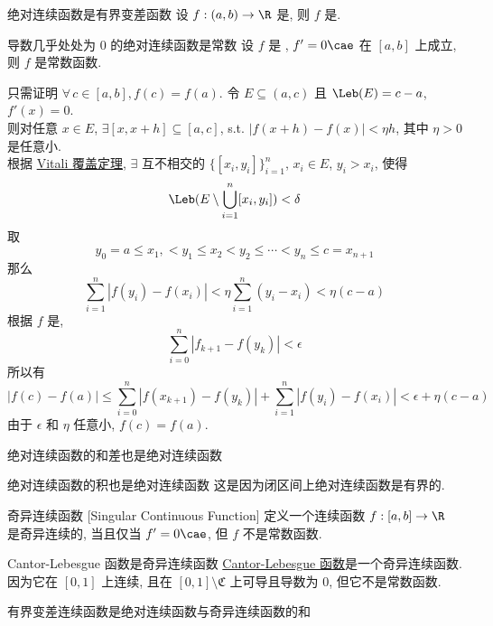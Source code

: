 \begin{ppt}
    {绝对连续函数是有界变差函数}
    设 \(f:(a,b)\to\R\) 是\ACFunc{}, 则 \(f\) 是\BVFunc{}.
\end{ppt}
\begin{thm}
    {导数几乎处处为 0 的绝对连续函数是常数}
    设 \(f\) 是 \ACFunc{}, \(f'=0\cae\) 在 \([a,b]\) 上成立, 则 \(f\) 是常数函数.
\end{thm}
\begin{prf}
    只需证明 \(\forall\,c\in[a,b], f(c)=f(a)\). 令 \(E\subseteq (a,c)\) 且 \(\Leb(E)=c-a\), \(f'(x)=0\). \\
    则对任意 \(x\in E\), \(\exists[x,x+h]\subseteq [a,c]\), s.t. \(|f(x+h)-f(x)|<\eta h\), 其中 \(\eta>0\) 是任意小.\\
    根据 \hyperref[thm:vitali-covering]{Vitali 覆盖定理}, \(\exists\) 互不相交的 \(\{[x_i,y_i]\}_{i=1}^n\), \(x_i\in E\), \(y_i>x_i\), 使得 
    \[\Leb(E\setminus\bigcup_{i=1}^n [x_i, y_i])<\delta\]
    取
    \[y_0=a\leq x_1,<y_1\leq x_2<y_2 \leq \cdots < y_n\leq c=x_{n+1}\]
    那么
    \[\sum_{i=1}^n |f(y_i)-f(x_i)|<\eta\sum_{i=1}^n (y_i-x_i)<\eta(c-a)\]
    根据 \(f\) 是\ACFunc{},
    \[\sum_{i=0}^{n}|f_{k+1}-f(y_k)|<\epsilon\]
    所以有
    \[|f(c)-f(a)|\leq\sum_{i=0}^{n}|f(x_{k+1})-f(y_k)|+\sum_{i=1}^n |f(y_i)-f(x_i)|<\epsilon+\eta(c-a)\]
    由于 \(\epsilon\) 和 \(\eta\) 任意小, \(f(c)=f(a)\).
\end{prf}
\begin{ppt}
    {绝对连续函数的和差也是绝对连续函数}
\end{ppt}
\begin{ppt}
    {绝对连续函数的积也是绝对连续函数}
    这是因为闭区间上绝对连续函数是有界的.
\end{ppt}
\begin{dfn}
    {奇异连续函数}
    [Singular Continuous Function]
    定义一个连续函数 \(f:[a,b]\to\R\) 是奇异连续的, 当且仅当 \(f'=0\cae\), 但 \(f\) 不是常数函数.
\end{dfn}
\begin{xmp}
    {Cantor-Lebesgue 函数是奇异连续函数}
    \hyperref[dfn:cantor-lebesgue-function]{Cantor-Lebesgue 函数}是一个奇异连续函数. 因为它在 \([0,1]\) 上连续, 且在 \([0,1]\setminus\mathfrak{C}\) 上可导且导数为 0, 但它不是常数函数.
\end{xmp}
\begin{ppt}
    {有界变差连续函数是绝对连续函数与奇异连续函数的和}
\end{ppt}

